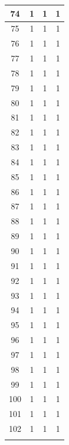\begin{longtable}[c]{|c|c|c|c|}
74 & 1 & 1 & 1 \\ \hline
\rowcolor[HTML]{81DAF5} 
75 & 1 & 1 & 1 \\ \hline
\rowcolor[HTML]{81DAF5} 
76 & 1 & 1 & 1 \\ \hline
\rowcolor[HTML]{81DAF5} 
77 & 1 & 1 & 1 \\ \hline
\rowcolor[HTML]{81DAF5} 
78 & 1 & 1 & 1 \\ \hline
\rowcolor[HTML]{81DAF5} 
79 & 1 & 1 & 1 \\ \hline
\rowcolor[HTML]{81DAF5} 
80 & 1 & 1 & 1 \\ \hline
\rowcolor[HTML]{81DAF5} 
81 & 1 & 1 & 1 \\ \hline
\rowcolor[HTML]{81DAF5} 
82 & 1 & 1 & 1 \\ \hline
\rowcolor[HTML]{81DAF5} 
83 & 1 & 1 & 1 \\ \hline
\rowcolor[HTML]{81DAF5} 
84 & 1 & 1 & 1 \\ \hline
\rowcolor[HTML]{81DAF5} 
85 & 1 & 1 & 1 \\ \hline
\rowcolor[HTML]{81DAF5} 
86 & 1 & 1 & 1 \\ \hline
\rowcolor[HTML]{81DAF5} 
87 & 1 & 1 & 1 \\ \hline
\rowcolor[HTML]{81DAF5} 
88 & 1 & 1 & 1 \\ \hline
\rowcolor[HTML]{81DAF5} 
89 & 1 & 1 & 1 \\ \hline
\rowcolor[HTML]{81DAF5} 
90 & 1 & 1 & 1 \\ \hline
\rowcolor[HTML]{81DAF5} 
91 & 1 & 1 & 1 \\ \hline
\rowcolor[HTML]{81DAF5} 
92 & 1 & 1 & 1 \\ \hline
\rowcolor[HTML]{81DAF5} 
93 & 1 & 1 & 1 \\ \hline
\rowcolor[HTML]{81DAF5} 
94 & 1 & 1 & 1 \\ \hline
\rowcolor[HTML]{81DAF5} 
95 & 1 & 1 & 1 \\ \hline
\rowcolor[HTML]{81DAF5} 
96 & 1 & 1 & 1 \\ \hline
\rowcolor[HTML]{81DAF5} 
97 & 1 & 1 & 1 \\ \hline
\rowcolor[HTML]{81DAF5} 
98 & 1 & 1 & 1 \\ \hline
\rowcolor[HTML]{81DAF5} 
99 & 1 & 1 & 1 \\ \hline
\rowcolor[HTML]{81DAF5} 
100 & 1 & 1 & 1 \\ \hline
\rowcolor[HTML]{81DAF5} 
101 & 1 & 1 & 1 \\ \hline
\rowcolor[HTML]{81DAF5} 
102 & 1 & 1 & 1 \\ \hline
\rowcolor[HTML]{81DAF5} 

\end{longtable}
